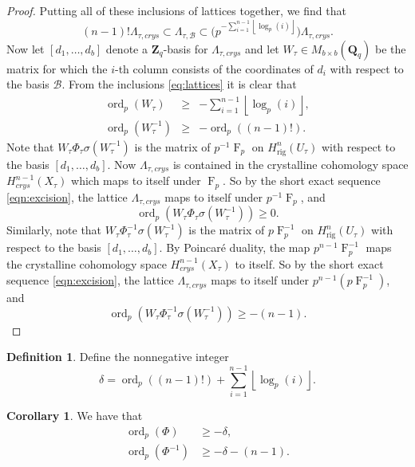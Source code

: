 \documentclass[a4paper,11pt]{article}
\numberwithin{equation}{section}
\providecommand{\floor}[1]{\left\lfloor#1\right\rfloor}   %
\newcommand{\ZZ}{\mathbf{Z}} %
\newcommand{\QQ}{\mathbf{Q}} %
\DeclareMathOperator{\ord}{ord}          %
\DeclareMathOperator{\Frob}{F}           %
\providecommand{\Hrig}{H_{\text{rig}}}  %
\providecommand{\cB}{\mathcal{B}} %
\theoremstyle{definition}
\newtheorem{cor}[thm]{Corollary}
\newtheorem{defn}[thm]{Definition}
\begin{document}
\begin{proof}
Putting all of these inclusions of lattices together, we find that
\begin{equation} \label{eq:lattices}
(n-1)! \Lambda_{\tau,crys} \subset \Lambda_{\tau,\cB} \subset \bigl( p^{-\sum_{i=1}^{n-1} \floor{\log_p(i)}} \bigr) \Lambda_{\tau,crys}.
\end{equation}
Now let $[d_1, \ldots, d_b]$ denote a $\ZZ_q$-basis for $\Lambda_{\tau,crys}$ and let $W_{\tau} \in M_{b \times b}(\QQ_q)$ be the matrix
for which the $i$-th column consists of the coordinates of $d_i$ with respect to the basis $\cB$. From the inclusions \eqref{eq:lattices}
it is clear that 
\begin{eqnarray*}
\ord_p(W_{\tau}) &\geq& -\sum_{i=1}^{n-1} \floor{\log_p(i)}, \\
\ord_p(W_{\tau}^{-1}) &\geq& -\ord_p((n-1)!).
\end{eqnarray*}
Note that $W_{\tau} \Phi_{\tau} \sigma(W_{\tau}^{-1})$ is the matrix of $p^{-1}\Frob_{p}$ on $\Hrig^n(U_{\tau})$
with respect to the basis $[d_1,\ldots,d_b]$. Now $\Lambda_{\tau,crys}$ is contained in the crystalline cohomology 
space $H^{n-1}_{crys}(X_{\tau})$ which maps to itself under $\Frob_p$. So by the short exact sequence 
\eqref{eqn:excision}, the lattice $\Lambda_{\tau,crys}$ maps to itself under $p^{-1}\Frob_{p}$, and
\[
\ord_p(W_{\tau} \Phi_{\tau} \sigma(W_{\tau}^{-1})) \geq 0.
\]
Similarly, note that $W_{\tau} \Phi_{\tau}^{-1} \sigma(W_{\tau}^{-1})$ is the matrix of $p\Frob_p^{-1}$ on 
$\Hrig^n(U_{\tau})$ with respect to the basis $[d_1,\ldots,d_b]$. By Poincar\'e duality, 
the map $p^{n-1}\Frob_p^{-1}$ maps the crystalline cohomology space $H^{n-1}_{crys}(X_{\tau})$
to itself. So by the short exact sequence \eqref{eqn:excision}, the lattice $\Lambda_{\tau,crys}$ 
maps to itself under $p^{n-1} (p\Frob_p^{-1})$, and 
\[
\ord_p(W_{\tau} \Phi_{\tau}^{-1} \sigma(W_{\tau}^{-1})) \geq -(n-1).
\]
\end{proof}

\begin{defn} \label{defn:delta}
Define the nonnegative integer
\[
\delta = \ord_p((n-1)!)+\sum_{i=1}^{n-1} \floor{\log_p(i)}.
\]
\end{defn}

\begin{cor} \label{cor:delta} We have that
\begin{align*}
\ord_p(\Phi) &\geq -\delta, \\
\ord_p(\Phi^{-1}) &\geq -\delta-(n-1).
\end{align*}
\end{cor}
\end{document}
